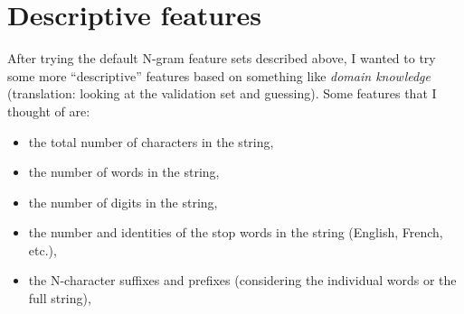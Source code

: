 \documentclass[11pt]{article}
\begin{document}
\clearpage

\section{Descriptive features}

After trying the default N-gram feature sets described above, I wanted to try
some more ``descriptive'' features based on something like \emph{domain
knowledge} (translation: looking at the validation set and guessing).
Some features that I thought of are:
\begin{itemize}
\item{the total number of characters in the string,}
\item{the number of words in the string,}
\item{the number of digits in the string,}
\item{the number and identities of the stop words in the string (English,
      French, etc.),}
\item{the N-character suffixes and prefixes (considering the individual
      words or the full string),}
\end{itemize}
\end{document}
